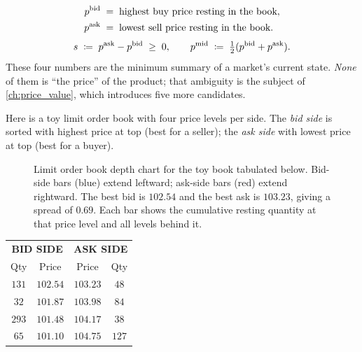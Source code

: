 \begin{keyfactbox}
\begin{align*}
  p^{\mathrm{bid}} &\;=\; \text{highest buy price resting in the book}, \\
  p^{\mathrm{ask}} &\;=\; \text{lowest sell price resting in the book}.
\end{align*}
\[
  s \;\coloneqq\; p^{\mathrm{ask}} - p^{\mathrm{bid}} \;\geq\; 0, \qquad
  p^{\mathrm{mid}} \;\coloneqq\; \tfrac{1}{2}(p^{\mathrm{bid}} + p^{\mathrm{ask}}).
\]
These four numbers are the minimum summary of a market's current
state. \emph{None} of them is ``the price'' of the product; that
ambiguity is the subject of \cref{ch:price_value}, which introduces
five more candidates.
\end{keyfactbox}

Here is a toy limit order book with four price levels per side. The
\emph{bid side} is sorted with highest price at top (best for a
seller); the \emph{ask side} with lowest price at top (best for a
buyer).

\begin{figure}[ht]
\centering
{}
\caption{Limit order book depth chart for the toy book tabulated
below. Bid-side bars (blue) extend leftward; ask-side bars (red)
extend rightward. The best bid is $102.54$ and the best ask is
$103.23$, giving a spread of $0.69$. Each bar shows the cumulative
resting quantity at that price level and all levels behind it.}
\label{fig:lob_depth_chart}
\end{figure}

\begin{center}
\begin{tabular}{cc|cc}
\toprule
\multicolumn{2}{c|}{\textbf{BID SIDE}} & \multicolumn{2}{c}{\textbf{ASK SIDE}} \\
Qty & Price & Price & Qty \\
\midrule
$131$ & $102.54$ & $103.23$ & $48$ \\
$32$  & $101.87$ & $103.98$ & $84$ \\
$293$ & $101.48$ & $104.17$ & $38$ \\
$65$  & $101.10$ & $104.75$ & $127$ \\
\bottomrule
\end{tabular}
\end{center}


